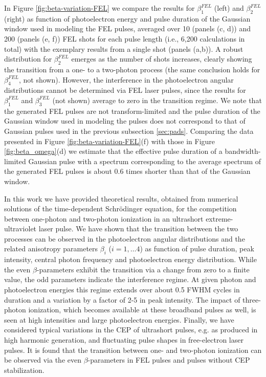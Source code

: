 In Figure \ref{fig:beta-variation-FEL} we compare the results for $\beta_1^{FEL}$ (left) and $\beta_2^{FEL}$ (right) as function of photoelectron energy and pulse duration of the Gaussian window used in modeling the FEL pulses, averaged over 10 (panels (c, d)) and 200 (panels (e, f)) FEL shots for each pulse length (i.e., 6,200 calculations in total) with the exemplary results from a single shot (panels (a,b)). A robust distribution for $\beta_2^{FEL}$ emerges as the number of shots increases, clearly showing the transition from a one- to a two-photon process (the same conclusion holds for $\beta_4^{FEL}$, not shown). However, the interference in the photoelectron angular distributions cannot be determined via FEL laser pulses, since the results for $\beta_1^{FEL}$ and $\beta_3^{FEL}$ (not shown) average to zero in the transition regime. 
We note that the generated FEL pulses are not transform-limited and the pulse duration of the Gaussian window used in modeling the pulses does not correspond to that of Gaussian pulses used in the previous subsection \ref{sec:pads}.
Comparing the data presented in Figure \ref{fig:beta-variation-FEL}(f) with those in Figure \ref{fig:beta_omega}(d) we estimate that the effective pulse duration of a bandwidth-limited Gaussian pulse with a spectrum corresponding to the average spectrum of the generated FEL pulses is about 0.6 times shorter than that of the Gaussian window.

In this work we have provided theoretical results, obtained from numerical solutions of the time-dependent Schr\"odinger equation, for the competition between one-photon and two-photon ionization in an ultrashort extreme-ultraviolet laser pulse. We have shown that the transition between the two processes can be observed in the photoelectron angular distributions and the related anisotropy parameters $\beta_i$ ($i = 1, \ldots 4$) as function of pulse duration, peak intensity, central photon frequency and photoelectron energy distribution. While the even $\beta$-parameters exhibit the transition via a change from zero to a finite value, the odd parameters indicate the interference regime. At given photon and photoelectron energies this regime extends over about 0.5 FWHM cycles in duration and a variation by a factor of 2-5 in peak intensity. The impact of three-photon ionization, which becomes available at these broadband pulses as well, is seen at high intensities and large photoelectron energies. Finally, we have considered typical variations in the CEP of ultrashort pulses, e.g. as produced in high harmonic generation, and fluctuating pulse shapes in free-electron laser pulses. It is found that the transition between one- and two-photon ionization can be observed via the even $\beta$-parameters in FEL pulses and pulses without CEP stabilization.



